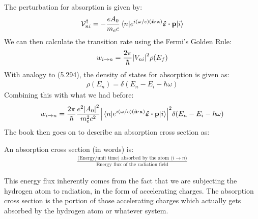 \documentclass[12pt]{article}
\begin{document}
The perturbation for absorption is given by:
\begin{align*}
  \mcV^\dag_{ni}=-\frac{eA_0}{m_e c}\mel{n}
  {e^{i(\omega/c)(\vu{n}\vdot\vb{x})}\bm{\hat{\veps}}\vdot\vb{p}}{i}
\end{align*}
We can then calculate the transition rate using the Fermi's Golden Rule:
\begin{align*}
  w_{i\to n}=\frac{2\pi}{\hbar}\abs{V_{ni}}^2\rho(E_f)
\end{align*}
With analogy to (5.294), the density of states for absorption is given as:
\begin{align*}
  \rho(E_n)=\delta(E_n-E_i-\hbar\omega)
\end{align*}
Combining this with what we had before:
\begin{align*}
  w_{i\to n}=\frac{2\pi}{\hbar}\frac{e^2\abs{A_0}^2}{m_e^2c^2}
  \abs{
    \mel{n}{e^{i(\omega/c)(\vu{n}\vdot\vb{x})}\bm{\hat{\veps}}\vdot\vb{p}}{i}}^2
  \delta(E_n-E_i-\hbar\omega)
\end{align*}
The book then goes on to describe an absorption cross section as:
\begin{thebook*}
  An absorption cross section (in words) is:
  \begin{align*}
    \frac{\text{(Energy/unit time) absorbed by the atom ($i\to n$)}}
    {\text{Energy flux of the radiation field}}
  \end{align*}
\end{thebook*}
This energy flux inherently comes from the fact that we are subjecting the hydrogen atom to radiation, in the form of accelerating charges. The absorption cross section is the portion of those accelerating charges which actually gets absorbed by the hydrogen atom or whatever system.
\end{document}
